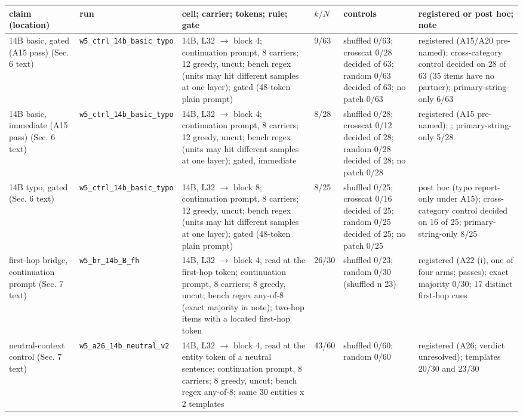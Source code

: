 \begin{table}[t]
\centering
\small
\setlength{\tabcolsep}{1mm}
\begin{tabular}{@{}p{2.5cm}p{2.3cm}p{4.5cm}p{1.3cm}p{3.0cm}p{2.9cm}@{}}
\toprule
claim (location) & run & cell; carrier; tokens; rule; gate & $k/N$ & controls & registered or post hoc; note \\
\midrule
14B basic, gated (A15 pass) (Sec. 6 text) & \texttt{w5\_\allowbreak{{}}ctrl\_\allowbreak{{}}14b\_\allowbreak{{}}basic\_\allowbreak{{}}typo} & 14B, L32 $\to$ block 4; continuation prompt, 8 carriers; 12 greedy, uncut; bench regex (units may hit different samples at one layer); gated (48-token plain prompt) & 9/63 & shuffled 0/63; crosscat 0/28 decided of 63; random 0/63 decided of 63; no patch 0/63 & registered (A15/A20 pre-named); cross-category control decided on 28 of 63 (35 items have no partner); primary-string-only 6/63 \\
14B basic, immediate (A15 pass) (Sec. 6 text) & \texttt{w5\_\allowbreak{{}}ctrl\_\allowbreak{{}}14b\_\allowbreak{{}}basic\_\allowbreak{{}}typo} & 14B, L32 $\to$ block 4; continuation prompt, 8 carriers; 12 greedy, uncut; bench regex (units may hit different samples at one layer); gated, immediate & 8/28 & shuffled 0/28; crosscat 0/12 decided of 28; random 0/28 decided of 28; no patch 0/28 & registered (A15 pre-named); ; primary-string-only 5/28 \\
14B typo, gated (Sec. 6 text) & \texttt{w5\_\allowbreak{{}}ctrl\_\allowbreak{{}}14b\_\allowbreak{{}}basic\_\allowbreak{{}}typo} & 14B, L32 $\to$ block 8; continuation prompt, 8 carriers; 12 greedy, uncut; bench regex (units may hit different samples at one layer); gated (48-token plain prompt) & 8/25 & shuffled 0/25; crosscat 0/16 decided of 25; random 0/25 decided of 25; no patch 0/25 & post hoc (typo report-only under A15); cross-category control decided on 16 of 25; primary-string-only 8/25 \\
first-hop bridge, continuation prompt (Sec. 7 text) & \texttt{w5\_\allowbreak{{}}br\_\allowbreak{{}}14b\_\allowbreak{{}}B\_\allowbreak{{}}fh} & 14B, L32 $\to$ block 4, read at the first-hop token; continuation prompt, 8 carriers; 8 greedy, uncut; bench regex any-of-8 (exact majority in note); two-hop items with a located first-hop token & 26/30 & shuffled 0/23; random 0/30 (shuffled n 23) & registered (A22 (i), one of four arms; passes); exact majority 0/30; 17 distinct first-hop cues \\
neutral-context control (Sec. 7 text) & \texttt{w5\_\allowbreak{{}}a26\_\allowbreak{{}}14b\_\allowbreak{{}}neutral\_\allowbreak{{}}v2} & 14B, L32 $\to$ block 4, read at the entity token of a neutral sentence; continuation prompt, 8 carriers; 8 greedy, uncut; bench regex any-of-8; same 30 entities x 2 templates & 43/60 & shuffled 0/60; random 0/60 & registered (A26; verdict unresolved); templates 20/30 and 23/30 \\

\end{tabular}
\end{table}
